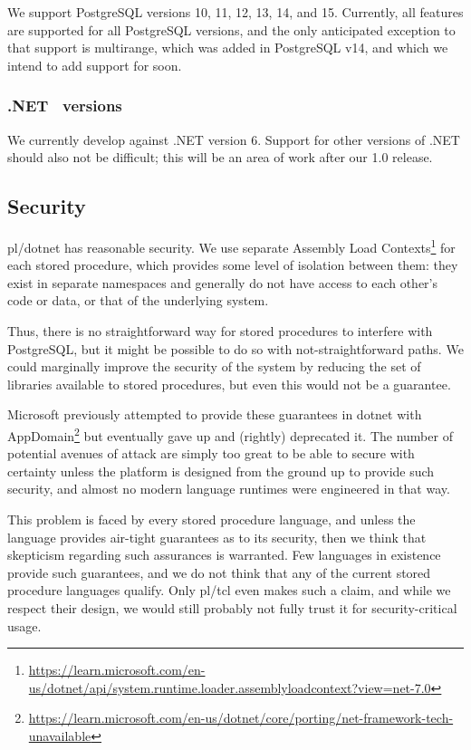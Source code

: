 \documentclass[sigconf,techreport,authorversion,nonacm]{acmart}
\newcommand{\dotnet}{.NET }
\begin{document}
We support PostgreSQL versions 10, 11, 12, 13, 14, and 15.
Currently, all features are supported for all PostgreSQL
versions, and the only anticipated exception to that support
is multirange, which was added in PostgreSQL v14, and which
we intend to add support for soon.

\subsubsection{\dotnet\ versions}

We currently develop against \dotnet version 6.  Support for other
versions of \dotnet should also not be difficult; this will be an
area of work after our 1.0 release.

\subsection{Security}

pl/dotnet has reasonable security. We use separate Assembly Load Contexts\footnote{\url{https://learn.microsoft.com/en-us/dotnet/api/system.runtime.loader.assemblyloadcontext?view=net-7.0}}
for each stored procedure, which provides some level of isolation
between them: they exist in separate namespaces and generally
do not have access to each other's code or data, or that of
the underlying system.

Thus, there is no straightforward way for stored procedures to
interfere with PostgreSQL, but it might be possible to do so with
not-straightforward paths. We could marginally improve the security
of the system by reducing the set of libraries available to
stored procedures, but even this would not be a guarantee.

Microsoft previously attempted to provide these guarantees in
dotnet with AppDomain\footnote{\url{https://learn.microsoft.com/en-us/dotnet/core/porting/net-framework-tech-unavailable}}
but eventually gave up and (rightly) deprecated it. The number
of potential avenues of attack are simply too great to be able
to secure with certainty unless the platform is designed
from the ground up to provide such security, and almost no modern
language runtimes were engineered in that way.

This problem is faced by every stored procedure language, and unless
the language provides air-tight guarantees as to its security, then
we think that skepticism regarding such assurances is warranted.
Few languages in existence provide such guarantees, and we do not
think that any of the current stored procedure languages qualify.
Only pl/tcl even makes such a claim, and while we respect their
design, we would still probably not fully trust it for security-critical
usage.
\end{document}
